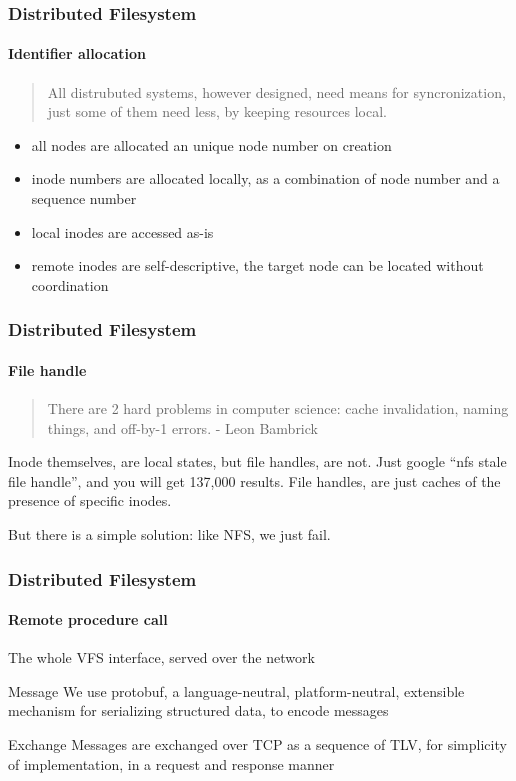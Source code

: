 \documentclass{ctexbeamer}
\begin{document}
\begin{frame}
\frametitle{Distributed Filesystem}
\framesubtitle{Identifier allocation}
\begin{verse}
  All distrubuted systems, however designed, need means for syncronization, just some of them need less, by keeping resources local.
\end{verse}
\begin{itemize}
  \item all nodes are allocated an unique node number on creation
  \item inode numbers are allocated locally, as a combination of node number and a sequence number
  \item local inodes are accessed as-is
  \item remote inodes are self-descriptive, the target node can be located without coordination
\end{itemize}
\end{frame}

\begin{frame}
\frametitle{Distributed Filesystem}
\framesubtitle{File handle}
\begin{quotation}
  There are 2 hard problems in computer science: cache invalidation, naming things, and off-by-1 errors.
  \flushright - Leon Bambrick
\end{quotation}
Inode themselves, are local states, but file handles, are not. Just google ``nfs stale file handle'', and you will get 137,000 results. File handles, are just caches of the presence of specific inodes.

But there is a simple solution: like NFS, we just fail.
\end{frame}

\begin{frame}
\frametitle{Distributed Filesystem}
\framesubtitle{Remote procedure call}
The whole VFS interface, served over the network
\begin{block}{Message}
  We use protobuf, a language-neutral, platform-neutral, extensible mechanism for serializing structured data, to encode messages
\end{block}
\begin{block}{Exchange}
  Messages are exchanged over TCP as a sequence of TLV, for simplicity of implementation, in a request and response manner
\end{block}
\end{frame}
  
\end{document}
